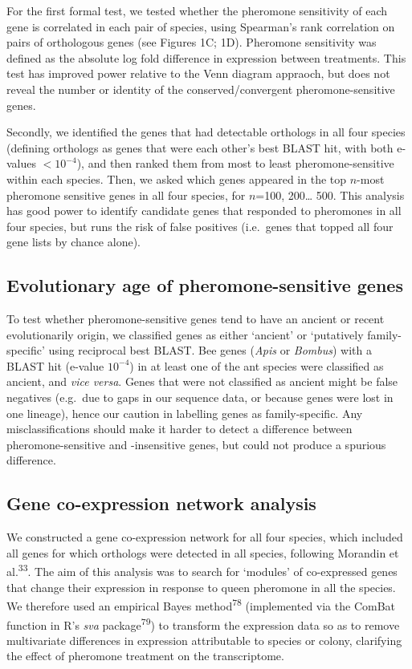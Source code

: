 \documentclass[12pt,]{article}
\begin{document}
For the first formal test, we tested whether the pheromone sensitivity
of each gene is correlated in each pair of species, using Spearman's
rank correlation on pairs of orthologous genes (see Figures 1C; 1D).
Pheromone sensitivity was defined as the absolute log fold difference in
expression between treatments. This test has improved power relative to
the Venn diagram appraoch, but does not reveal the number or identity of
the conserved/convergent pheromone-sensitive genes.

Secondly, we identified the genes that had detectable orthologs in all
four species (defining orthologs as genes that were each other's best
BLAST hit, with both e-values \(<10^{-4}\)), and then ranked them from
most to least pheromone-sensitive within each species. Then, we asked
which genes appeared in the top \(n\)-most pheromone sensitive genes in
all four species, for \(n\)=100, 200\ldots{} 500. This analysis has good
power to identify candidate genes that responded to pheromones in all
four species, but runs the risk of false positives (i.e.~genes that
topped all four gene lists by chance alone).

\subsection{Evolutionary age of pheromone-sensitive
genes}\label{evolutionary-age-of-pheromone-sensitive-genes}

To test whether pheromone-sensitive genes tend to have an ancient or
recent evolutionarily origin, we classified genes as either `ancient' or
`putatively family-specific' using reciprocal best BLAST. Bee genes
(\emph{Apis} or \emph{Bombus}) with a BLAST hit (e-value \(10^{-4}\)) in
at least one of the ant species were classified as ancient, and
\emph{vice versa}. Genes that were not classified as ancient might be
false negatives (e.g.~due to gaps in our sequence data, or because genes
were lost in one lineage), hence our caution in labelling genes as
family-specific. Any misclassifications should make it harder to detect
a difference between pheromone-sensitive and -insensitive genes, but
could not produce a spurious difference.

\subsection{Gene co-expression network
analysis}\label{gene-co-expression-network-analysis}

We constructed a gene co-expression network for all four species, which
included all genes for which orthologs were detected in all species,
following Morandin et al.\textsuperscript{33}. The aim of this analysis
was to search for `modules' of co-expressed genes that change their
expression in response to queen pheromone in all the species. We
therefore used an empirical Bayes method\textsuperscript{78}
(implemented via the ComBat function in R's \emph{sva}
package\textsuperscript{79}) to transform the expression data so as to
remove multivariate differences in expression attributable to species or
colony, clarifying the effect of pheromone treatment on the
transcriptome.
\end{document}

